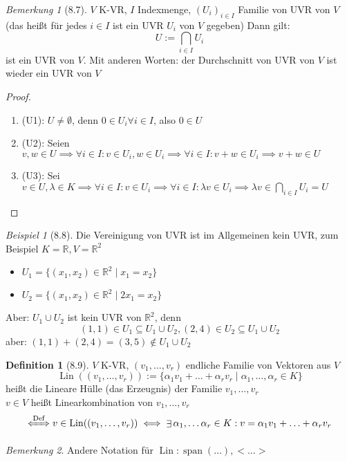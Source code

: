\documentclass[a4paper]{scrartcl}
\DeclareMathOperator{\Exists}{\exists}
\DeclareMathOperator{\Forall}{\forall}
\DeclareMathOperator{\Lin}{Lin}
\DeclareMathOperator{\Span}{span}
\theoremstyle{definition}
\newtheorem{defn}{Definition}
\theoremstyle{plain}
\theoremstyle{plain}
\theoremstyle{remark}
\newtheorem{remark}{Bemerkung}
\theoremstyle{remark}
\theoremstyle{remark}
\theoremstyle{remark}
\theoremstyle{remark}
\newtheorem{ex}{Beispiel}
\begin{document}
\begin{remark}[8.7]
$V$ K-VR, $I$ Indexmenge, $(U_i)_{i\in I}$ Familie von UVR von $V$ (das heißt für jedes $i\in I$ ist ein UVR $U_i$ von $V$ gegeben)
Dann gilt:
\[U := \bigcap_{i \in I} U_i\]
ist ein UVR von $V$. Mit anderen Worten: der Durchschnitt von UVR von $V$ ist wieder ein UVR von $V$
\end{remark}
\begin{proof}
\begin{enumerate}
\item (U1): $U \neq \emptyset$, denn $0 \in U_i \Forall i\in I$, also $0 \in U$
\item (U2): Seien $v,w \in U \implies \Forall i \in I: v\in U_i, w \in U_i \implies \Forall i\in I: v + w \in U_i \implies v + w \in U$
\item (U3): Sei $v \in U, \lambda \in K \implies \Forall i\in I: v\in U_i \implies \Forall i\in I: \lambda v \in U_i \implies \lambda v \in \bigcap_{i\in I} U_i = U$
\end{enumerate}
\end{proof}
\begin{ex}[8.8]
Die Vereinigung von UVR ist im Allgemeinen kein UVR, zum Beispiel $K = \mathbb{R}, V =\mathbb{R}^2$
\begin{itemize}
\item $U_1 = \{(x_1, x_2) \in \mathbb{R}^2 \mid x_1 = x_2\}$
\item $U_2 = \{(x_1, x_2) \in \mathbb{R}^2 \mid 2 x_1 = x_2\}$
\end{itemize}
Aber: $U_1 \cup U_2$ ist kein UVR von $\mathbb{R}^2$, denn
\[(1,1) \in U_1 \subseteq U_1 \cup U_2, (2, 4) \in U_2 \subseteq U_1 \cup U_2\]
aber: $(1, 1) + (2, 4) = (3, 5) \not\in U_1 \cup U_2$
\end{ex}
\begin{defn}[8.9]
$V$ K-VR, $(v_1, \ldots, v_r)$ endliche Familie von Vektoren aus $V$
\[\Lin((v_1, \ldots, v_r)) := \{\alpha_1 v_1 + \ldots + \alpha_r v_r \mid \alpha_1, \ldots, \alpha_r \in K\}\]
heißt die Lineare Hülle (das Erzeugnis) der Familie $v_1, \ldots, v_r$ \\
  $v \in V$ heißt Linearkombination von $v_1, \ldots, v_r$
\[\xLeftrightarrow{\text{Def}} v\in \Lin((v_1, \ldots, v_r)) \iff \Exists \alpha_1, \ldots \alpha_r \in K: v = \alpha_1 v_1 + \ldots + \alpha_r v_r\]
\end{defn}
\begin{remark}
Andere Notation für $\Lin: \Span(\ldots), <\ldots>$
\end{remark}
\end{document}

